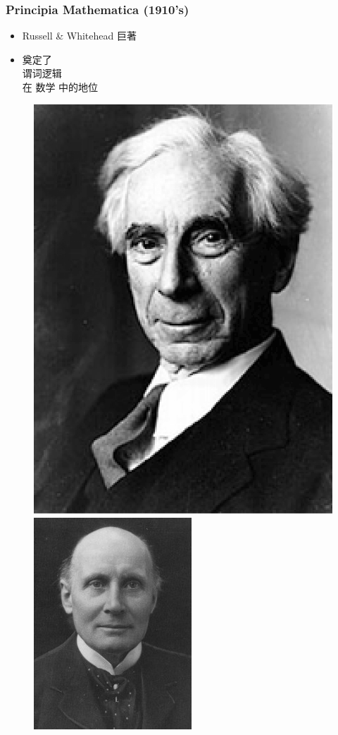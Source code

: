 \documentclass[17pt]{beamer}
\begin{document}
\begin{frame}
\frametitle{Principia Mathematica (1910's)}
\fontsize{16}{16}\selectfont
\begin{minipage}[t]{0.35\linewidth}
	\begin{itemize}
		\item Russell \& Whitehead 巨著
		\item 奠定了 \\
		{\color{red}谓词逻辑} \\
		在 数学 中的地位
	\end{itemize}
\end{minipage}
\hfill
\begin{minipage}[t]{0.61\linewidth}
	\begin{figure}[H]
		\includegraphics[scale=0.1]{Russell.jpg}
		\includegraphics[scale=0.4]{Whitehead.jpg}

\end{figure}
\end{minipage}
\end{frame}
\end{document}
